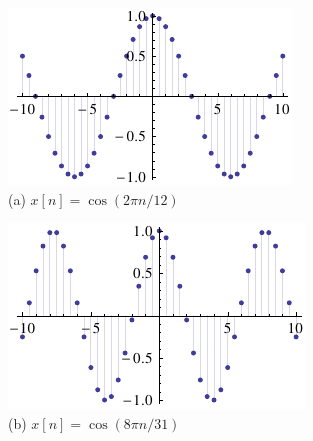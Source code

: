             \begin{figure}[h!]\centering
                \begin{minipage}{0.3\linewidth}\centering
                    \includegraphics[width=\linewidth]{signals_chaps/lect2_inc/const-dt-eg-1.pdf}\\
                    (a) $x[n]=\cos(2\pi n/12)$
                \end{minipage}
                \begin{minipage}{0.3\linewidth}\centering
                    \includegraphics[width=\linewidth]{signals_chaps/lect2_inc/const-dt-eg-2.pdf}\\
                    (b) $x[n]=\cos(8\pi n/31)$
                \end{minipage}
                \begin{minipage}{0.3\linewidth}\centering

\end{minipage}
\end{figure}
